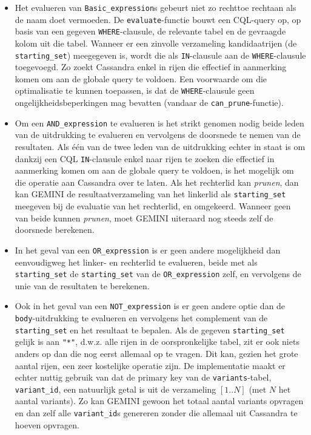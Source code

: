 \begin{itemize}
\item Het evalueren van \texttt{Basic\_expression}s gebeurt niet zo rechttoe rechtaan als de naam doet vermoeden. De \texttt{evaluate}-functie bouwt een CQL-query op, op basis van een gegeven \texttt{WHERE}-clausule, de relevante tabel en de gevraagde kolom uit die tabel. Wanneer er een zinvolle verzameling kandidaatrijen (de \texttt{starting\_set}) meegegeven is, wordt die als \texttt{IN}-clausule aan de \texttt{WHERE}-clausule toegevoegd. Zo zoekt Cassandra enkel in rijen die effectief in aanmerking komen om aan de globale query te voldoen. Een voorwaarde om die optimalisatie te kunnen toepassen, is dat de \texttt{WHERE}-clausule geen ongelijkheidsbeperkingen mag bevatten (vandaar de \texttt{can\_prune}-functie).



\item Om een \texttt{AND\_expression} te evalueren is het strikt genomen nodig beide leden van de uitdrukking te evalueren en vervolgens de doorsnede te nemen van de resultaten. Als \'e\'en van de twee leden van de uitdrukking echter in staat is om dankzij een CQL \texttt{IN}-clausule enkel naar rijen te zoeken die effectief in aanmerking komen om aan de globale query te voldoen, is het mogelijk om die operatie aan Cassandra over te laten. Als het rechterlid kan \textit{prunen}, dan kan GEMINI de resultaatverzameling van het linkerlid als \texttt{starting\_set} meegeven bij de evaluatie van het rechterlid, en omgekeerd. Wanneer geen van beide kunnen \textit{prunen}, moet GEMINI uiteraard nog steeds zelf de doorsnede berekenen.



\item In het geval van een \texttt{OR\_expression} is er geen andere mogelijkheid dan eenvoudigweg het linker- en rechterlid te evalueren, beide met als \texttt{starting\_set} de \texttt{starting\_set} van de \texttt{OR\_expression} zelf, en vervolgens de unie van de resultaten te berekenen.

\item Ook in het geval van een \texttt{NOT\_expression} is er geen andere optie dan de \texttt{body}-uitdrukking te evalueren en vervolgens het complement van de \texttt{starting\_set} en het resultaat te bepalen. Als de gegeven \texttt{starting\_set} gelijk is aan \texttt{"*"}, d.w.z. alle rijen in de oorspronkelijke tabel, zit er ook niets anders op dan die nog eerst allemaal op te vragen. Dit kan, gezien het grote aantal rijen, een zeer kostelijke operatie zijn. De implementatie maakt er echter nuttig gebruik van dat de primary key van de \texttt{variants}-tabel, \texttt{variant\_id}, een natuurlijk getal is uit de verzameling $[1..N]$ (met $N$ het aantal variants). Zo kan GEMINI gewoon het totaal aantal variants opvragen en dan zelf alle \texttt{variant\_id}s genereren zonder die allemaal uit Cassandra te hoeven opvragen.


\end{itemize}
